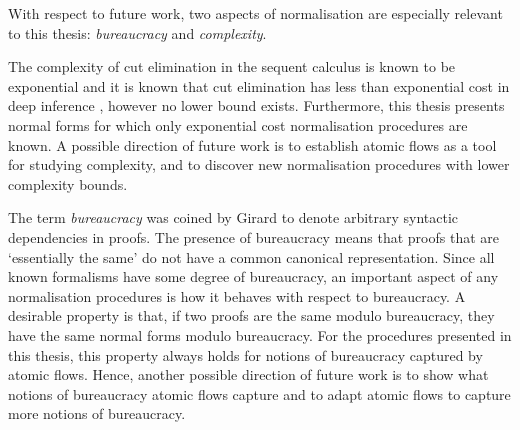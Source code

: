 With respect to future work, two aspects of normalisation are especially relevant to this thesis: \emph{bureaucracy} and \emph{complexity}.

The complexity of cut elimination in the sequent calculus is known to be exponential \cite{Stat:78:Bounds-f:fj} and it is known that cut elimination has less than exponential cost in deep inference \cite{Jera::On-the-C:kx}, however no lower bound exists. Furthermore, this thesis presents normal forms for which only exponential cost normalisation procedures are known. A possible direction of future work is to establish atomic flows as a tool for studying complexity, and to discover new normalisation procedures with lower complexity bounds.

The term \emph{bureaucracy} was coined by Girard to denote arbitrary syntactic dependencies in proofs. The presence of bureaucracy means that proofs that are `essentially the same' do not have a common canonical representation. Since all known formalisms have some degree of bureaucracy, an important aspect of any normalisation procedures is how it behaves with respect to bureaucracy. A desirable property is that, if two proofs are the same modulo bureaucracy, they have the same normal forms modulo bureaucracy. For the procedures presented in this thesis, this property always holds for notions of bureaucracy captured by atomic flows. Hence, another possible direction of future work is to show what notions of bureaucracy atomic flows capture and to adapt atomic flows to capture more notions of bureaucracy.


